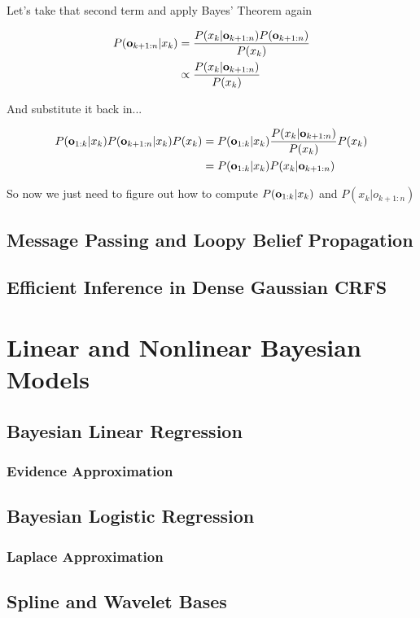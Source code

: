 \documentclass[12pt]{article}
\newcommand{\eq}[1]{\begin{align*}#1\end{align*}}
\begin{document}
Let's take that second term and apply Bayes' Theorem again

\eq{
  P(\o_{k+1:n}|x_k) &= \frac{P(x_k | \o_{k+1:n}) P(\o_{k+1:n})}{P(x_k)} \\
  &\propto \frac{P(x_k | \o_{k+1:n})}{P(x_k)}
}

And substitute it back in...

\eq{
  P(\o_{1:k}|x_k)P(\o_{k+1:n}|x_k)P(x_k) &= P(\o_{1:k}|x_k)\frac{P(x_k | \o_{k+1:n})}{P(x_k)}P(x_k)\\
  &= P(\o_{1:k}|x_k)P(x_k | \o_{k+1:n})
}

So now we just need to figure out how to compute $P(\mathbf{o}_{1:k}|x_k)$ and $P(x_k|o_{k+1:n})$

\subsection{Message Passing and Loopy Belief Propagation}

\subsection{Efficient Inference in Dense Gaussian CRFS}

\section{Linear and Nonlinear Bayesian Models}

\subsection{Bayesian Linear Regression}

\subsubsection{Evidence Approximation}

\subsection{Bayesian Logistic Regression}

\subsubsection{Laplace Approximation}

\subsection{Spline and Wavelet Bases}
\end{document}
